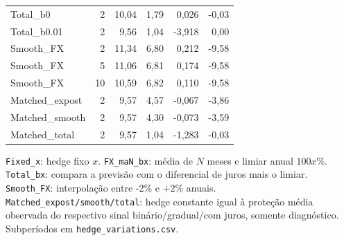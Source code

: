 \documentclass[11pt,a4paper]{article}
\begin{document}
\begin{center}
\begin{tabular}{lrrrrr}
Total\_b0 & 2 & 10,04 & 1,79 & 0,026 & -0,03 \\
Total\_b0.01 & 2 & 9,56 & 1,04 & -3,918 & 0,00 \\
Smooth\_FX & 2 & 11,34 & 6,80 & 0,212 & -9,58 \\
Smooth\_FX & 5 & 11,06 & 6,81 & 0,174 & -9,58 \\
Smooth\_FX & 10 & 10,59 & 6,82 & 0,110 & -9,58 \\
Matched\_expost & 2 & 9,57 & 4,57 & -0,067 & -3,86 \\
Matched\_smooth & 2 & 9,57 & 4,30 & -0,073 & -3,59 \\
Matched\_total & 2 & 9,57 & 1,04 & -1,283 & -0,03 \\
\bottomrule\end{tabular}\end{center}\normalsize

\texttt{Fixed\_x}: hedge fixo $x$. \texttt{FX\_maN\_bx}: média de $N$ meses e limiar anual $100x$\%. \texttt{Total\_bx}: compara a previsão com o diferencial de juros mais o limiar. \texttt{Smooth\_FX}: interpolação entre -2\% e +2\% anuais. \texttt{Matched\_expost/smooth/total}: hedge constante igual à proteção média observada do respectivo sinal binário/gradual/com juros, somente diagnóstico. Subperíodos em \texttt{hedge\_variations.csv}.

\clearpage
\end{document}
